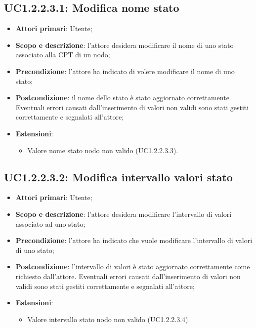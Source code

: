 \subsection{UC1.2.2.3.1: Modifica nome stato} 
\hypertarget{UC1.2.2.3.1}{} 
\begin{itemize} 
	\item{\textbf{Attori primari}: Utente;} 
	\item{\textbf{Scopo e descrizione}: l'attore desidera modificare il nome di uno stato associato alla CPT di un nodo;} 
	\item{\textbf{Precondizione}: l'attore ha indicato di volere modificare il nome di uno stato;} 
	\item{\textbf{Postcondizione}: il nome dello stato è stato aggiornato correttamente. Eventuali errori causati dall'inserimento di valori non validi sono stati gestiti correttamente e segnalati all'attore;}
	\item{\textbf{Estensioni}:
		\begin{itemize}
			\item{Valore nome stato nodo non valido (UC1.2.2.3.3)}.
		\end{itemize}
	}
\end{itemize} 
\subsection{UC1.2.2.3.2: Modifica intervallo valori stato} 
\hypertarget{UC1.2.2.3.2}{} 
\begin{itemize} 
	\item{\textbf{Attori primari}: Utente;} 
	\item{\textbf{Scopo e descrizione}: l'attore desidera modificare l'intervallo di valori associato ad uno stato;} 
	\item{\textbf{Precondizione}: l'attore ha indicato che vuole modificare l'intervallo di valori di uno stato;} 
	\item{\textbf{Postcondizione}: l'intervallo di valori è stato aggiornato correttamente come richiesto dall'attore. Eventuali errori causati dall'inserimento di valori non validi sono stati gestiti correttamente e segnalati all'attore;}
	\item{\textbf{Estensioni}:
		\begin{itemize}
			\item{Valore intervallo stato nodo non valido (UC1.2.2.3.4).}
		\end{itemize}
	}
\end{itemize}
